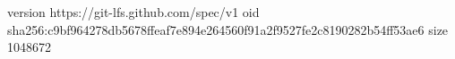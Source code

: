 version https://git-lfs.github.com/spec/v1
oid sha256:c9bf964278db5678ffeaf7e894e264560f91a2f9527fe2c8190282b54ff53ae6
size 1048672
